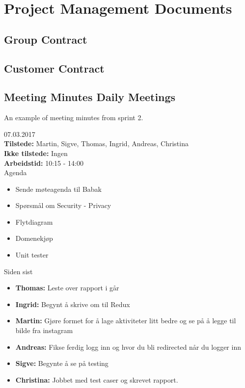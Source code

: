 \chapter{Project Management Documents}
\section{Group Contract}
\label{group_contract}





\section{Customer Contract}
\label{customer_contract}




\section{Meeting Minutes Daily Meetings}
\label{meeting_minutes_daily_meetings}

An example of meeting minutes from sprint 2. 

{\Large{07.03.2017}}\\
\textbf{Tilstede:} Martin, Sigve, Thomas, Ingrid, Andreas, Christina\\
\textbf{Ikke tilstede:} Ingen\\
\textbf{Arbeidstid:} 10:15 - 14:00\\

{\large{Agenda}}
\begin{itemize}
\setlength\itemsep{-0.7em}
    \item Sende møteagenda til Babak
    \item Spørsmål om Security - Privacy
    \item Flytdiagram
    \item Domenekjøp
    \item Unit tester
\end{itemize}


{\large{Siden sist}}
\begin{itemize}  
\setlength\itemsep{-0.7em}
    \item \textbf{Thomas:} Leste over rapport i går
    \item \textbf{Ingrid:} Begynt å skrive om til Redux
    \item \textbf{Martin:} Gjøre formet for å lage aktiviteter litt bedre og se på å legge til bilde fra instagram
    \item \textbf{Andreas:} Fikse ferdig logg inn og hvor du bli redirected når du logger inn
    \item \textbf{Sigve:} Begynte å se på testing
    \item \textbf{Christina:} Jobbet med test caser og skrevet rapport.
\end{itemize}


